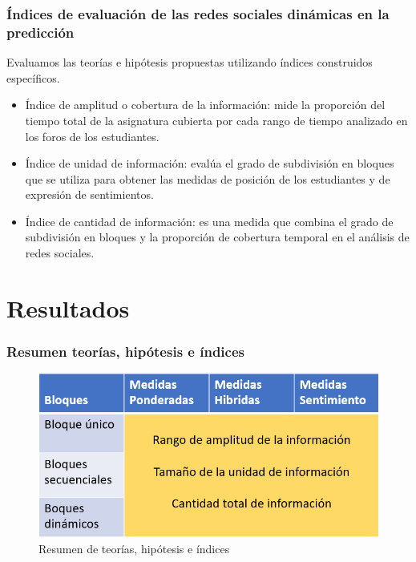 \documentclass{beamer}
\begin{document}
\begin{frame}
	\frametitle{Índices de evaluación de las redes sociales dinámicas en la predicción}
	\begin{block}{Evaluamos las teorías e hipótesis propuestas utilizando índices construidos específicos.}
	\begin{itemize}
		\item Índice de amplitud o cobertura de la información: mide la proporción del tiempo total de la asignatura cubierta por cada rango de tiempo analizado en los foros de los estudiantes.
		\item Índice de unidad de información: evalúa el grado de subdivisión en bloques que se utiliza para obtener las medidas de posición de los estudiantes y de expresión de sentimientos.
		\item Índice de cantidad de información: es una medida que combina el grado de subdivisión en bloques y la proporción de cobertura temporal en el análisis de redes sociales.
	\end{itemize}
	\end{block}
\end{frame}



\section{Resultados}

\begin{frame}
	\frametitle{Resumen teorías, hipótesis e índices}
	
	\begin{figure}[H]
		\centering
		\includegraphics[width=0.9\linewidth]{figs/imagen23}
		\caption{Resumen de teorías, hipótesis e índices}
		\label{fig:imagen23}
	\end{figure}
\end{frame}
\end{document}
